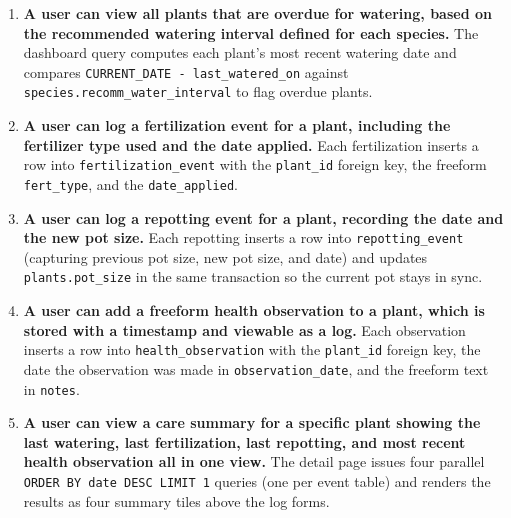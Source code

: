 \documentclass[11pt]{article}
\begin{document}
\begin{enumerate}
\item \textbf{A user can view all plants that are overdue for watering, based on the recommended watering interval defined for each species.}
The dashboard query computes each plant's most recent watering date and compares \texttt{CURRENT\_DATE - last\_watered\_on} against \texttt{species.recomm\_water\_interval} to flag overdue plants.

\item \textbf{A user can log a fertilization event for a plant, including the fertilizer type used and the date applied.}
Each fertilization inserts a row into \texttt{fertilization\_event} with the \texttt{plant\_id} foreign key, the freeform \texttt{fert\_type}, and the \texttt{date\_applied}.

\item \textbf{A user can log a repotting event for a plant, recording the date and the new pot size.}
Each repotting inserts a row into \texttt{repotting\_event} (capturing previous pot size, new pot size, and date) and updates \texttt{plants.pot\_size} in the same transaction so the current pot stays in sync.

\item \textbf{A user can add a freeform health observation to a plant, which is stored with a timestamp and viewable as a log.}
Each observation inserts a row into \texttt{health\_observation} with the \texttt{plant\_id} foreign key, the date the observation was made in \texttt{observation\_date}, and the freeform text in \texttt{notes}.

\item \textbf{A user can view a care summary for a specific plant showing the last watering, last fertilization, last repotting, and most recent health observation all in one view.}
The detail page issues four parallel \texttt{ORDER BY date DESC LIMIT 1} queries (one per event table) and renders the results as four summary tiles above the log forms.

\end{enumerate}
\end{document}
